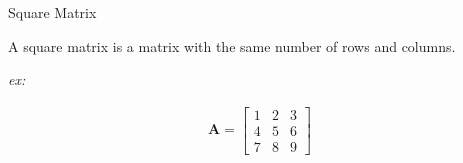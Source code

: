 Square Matrix

\begin{solution}
A square matrix is a matrix with the same number of rows and columns.

\emph{ex:}

\begin{align*}
    \boldsymbol{A} = \begin{bmatrix}
    1 & 2 & 3 \\ 4 & 5 & 6 \\ 7 & 8 & 9
    \end{bmatrix}
\end{align*}
\end{solution}